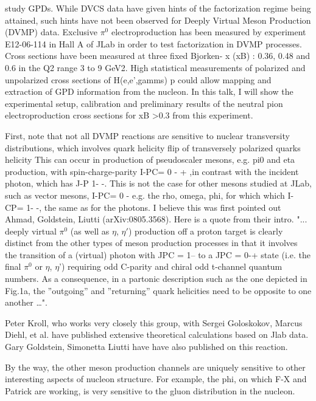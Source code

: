     study GPDs. While DVCS data have given hints of the factorization regime being attained, such hints have not been observed for Deeply Virtual Meson Production (DVMP) data. Exclusive $\pi^0$ electroproduction has been measured by experiment E12-06-114 in Hall A of JLab in order to test factorization in DVMP processes. Cross sections have been measured at three fixed Bjorken- x (xB) : 0.36, 0.48 and 0.6 in the Q2 range 3 to 9 GeV2. High statistical measurements of polarized and unpolarized cross sections of H(e,e',gamms) p could allow mapping and extraction of GPD information from the nucleon. In this talk, I will show the experimental setup, calibration and preliminary results of the neutral pion electroproduction cross sections for xB >0.3 from this experiment.  



        First, note that not all DVMP reactions are sensitive to nuclear transversity distributions, which involves quark helicity flip of transversely polarized quarks helicity  This can occur in  production of pseudoscaler mesons,  e.g. pi0 and eta production, with spin-charge-parity  I-PC= 0 - + ,in contrast with  the incident photon, which  has J-P 1- -. This is not the case for other mesons studied at JLab, such as vector mesons, I-PC= 0 - e.g. the rho, omega, phi, for which which I-CP= 1- -, the same as for the photons.   I believe this was first  pointed out  Ahmad, Goldstein, Liutti (arXiv:0805.3568). Here is a quote from their intro.
        "... deeply virtual $\pi^0$ (as well as $\eta$, $\eta'$) production off a proton target is clearly distinct from the other types of meson production processes in that it involves the transition of a (virtual) photon with JPC = 1-- to a JPC = 0-+ state (i.e. the final $\pi^0$ or $\eta$, $\eta$') requiring odd C-parity and chiral odd t-channel quantum numbers. As a consequence, in a partonic description such as the one depicted in Fig.1a, the ”outgoing” and ”returning” quark helicities need to be opposite to one another …". 
        
        Peter Kroll, who works very closely this group, with Sergei Goloskokov, Marcus Diehl, et al. have published extensive theoretical calculations based on Jlab data.   Gary Goldstein, Simonetta Liutti have have also published on this  reaction.
        
        By the way, the other meson production channels  are uniquely sensitive to other  interesting aspects of nucleon structure. For example, the phi, on which F-X and Patrick are working, is very sensitive to the gluon distribution in the nucleon.
        
